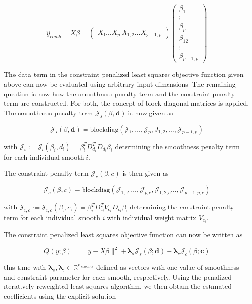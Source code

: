 \documentclass[10pt,a4paper]{article}
\begin{document}
	$$\hat y_{comb} = X \beta = \begin{pmatrix} X_1 \dots X_p \ X_{1,2} \dots X_{p-1,p}\end{pmatrix} \begin{pmatrix} \beta_1 \\ \vdots \\ \beta_p \\ \beta_{12} \\ \vdots \\ \beta_{p-1, p}  \end{pmatrix}$$
	
	The data term in the constraint penalized least squares objective function given above can now be evaluated using arbitrary input dimensions. The remaining question is now how the smoothness penalty term and the constraint penalty term are constructed. For both, the concept of block diagonal matrices is applied. The smoothness penalty term $\mathcal J_s(\beta, \mathbf d)$ is now given as
	
	$$\mathcal J_s(\beta, \mathbf d) = \text{blockdiag}(\mathcal J_1, \dots, \mathcal J_p, J_{1,2}, \dots, \mathcal J_{p-1,p}) $$
	
	with $\mathcal J_i := \mathcal J_i(\beta_i, d_i) = \beta_i^T D_{d_i}^T D_{d_i} \beta_i$ determining the smoothness penalty term for each individual smooth $i$. 
	
	The constraint penalty term $\mathcal J_c(\beta, c)$ is then given as
	
	$$\mathcal J_c(\beta, c) = \text{blockdiag}(\mathcal J_{1,c}, \dots, \mathcal J_{p,c}, \mathcal J_{1,2,c} \dots, \mathcal J_{p-1,p,c})$$
	
	with $\mathcal J_{i,c} := \mathcal J_{i,c}(\beta_i, c_i) = \beta_i^T D_{c_i}^T V_{c_i} D_{c_i} \beta_i$ determining the constraint penalty term for each individual smooth $i$ with individual weight matrix $V_{c_i}$. 
	
	The constraint penalized least squares objective function can now be written as
	
	$$Q(y; \beta) = \lVert y - X\beta \rVert^2 + \boldsymbol \lambda_s \mathcal J_s(\beta; \boldsymbol d) + \boldsymbol \lambda_c \mathcal J_c(\beta; \boldsymbol c) $$
	
	this time with $\boldsymbol \lambda_s, \boldsymbol \lambda_c \in \mathbb{R}^{n_{smooths}}$  defined as vectors with one value of smoothness and constraint parameter for each smooth, respectively. Using the penalized iteratively-reweighted least squares algorithm, we then obtain the estimated coefficients using the explicit solution
	
\end{document}
